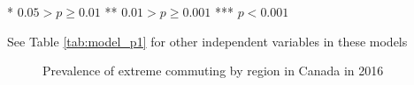 \documentclass[10 pt,letterpaper]{article}
\begin{document}
\begin{table}[H]
{\begin{tabular}{llllllll}
		\end{tabular}
		
		
	}
	
	\label{tab:model_p2}
	
	\vspace{2mm}
	
	\footnotesize
	
	* $0.05 > p \geq 0.01$ \hspace{3mm} ** $0.01 > p \geq 0.001$ \hspace{3mm} *** $p < 0.001$
	
	\vspace{1mm}
	
	See Table \ref{tab:model_p1} for other independent variables in these models
	
	\vspace{4.5mm}
	
	\normalsize
	
	
\end{table}





\begin{figure}[H]
	\centering
	\caption{Prevalence of extreme commuting by region in Canada in 2016}
	\label{fig:geog_base}
\end{figure}
\end{document}
